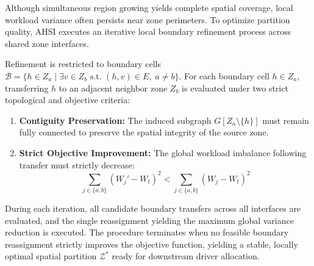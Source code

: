 \documentclass{article}
\begin{document}
Although simultaneous region growing yields complete spatial coverage, local workload variance often persists near zone perimeters. To optimize partition quality, AHSI executes an iterative local boundary refinement process across shared zone interfaces.

Refinement is restricted to boundary cells $\mathcal{B} = \{h \in Z_a \mid \exists v \in Z_b \text{ s.t. } (h, v) \in E, \; a \neq b\}$. For each boundary cell $h \in Z_a$, transferring $h$ to an adjacent neighbor zone $Z_b$ is evaluated under two strict topological and objective criteria:
\begin{enumerate}
    \item \textbf{Contiguity Preservation:} The induced subgraph $G[Z_a \setminus \{h\}]$ must remain fully connected to preserve the spatial integrity of the source zone.
    \item \textbf{Strict Objective Improvement:} The global workload imbalance following transfer must strictly decrease:
    $$
    \sum_{j \in \{a, b\}} (W_j' - W_t)^2 < \sum_{j \in \{a, b\}} (W_j - W_t)^2
    $$
\end{enumerate}

During each iteration, all candidate boundary transfers across all interfaces are evaluated, and the single reassignment yielding the maximum global variance reduction is executed. The procedure terminates when no feasible boundary reassignment strictly improves the objective function, yielding a stable, locally optimal spatial partition $\mathcal{Z}^*$ ready for downstream driver allocation.
\end{document}
